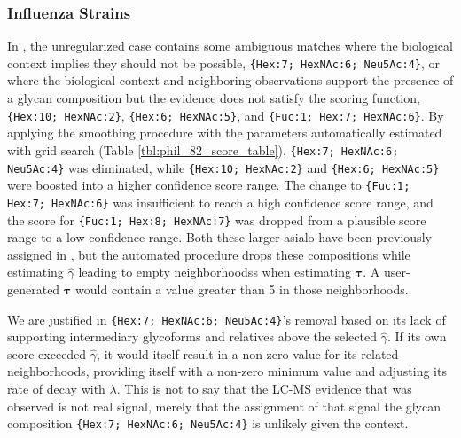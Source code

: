     \subsubsection{Influenza Strains}
        In \phil, the unregularized case contains some ambiguous matches where the biological
    context implies they should not be possible, \texttt{\{Hex:7; HexNAc:6; Neu5Ac:4\}}, or
    where the biological context and neighboring observations support the presence of a glycan
    composition but the evidence does not satisfy the scoring function, \texttt{\{Hex:10; HexNAc:2\}},
    \texttt{\{Hex:6; HexNAc:5\}}, and \texttt{\{Fuc:1; Hex:7; HexNAc:6\}}. By applying the smoothing
    procedure with the parameters automatically estimated with grid search (Table \ref{tbl:phil_82_score_table}),
    \texttt{\{Hex:7; HexNAc:6; Neu5Ac:4\}} was eliminated, while \texttt{\{Hex:10; HexNAc:2\}} and
    \texttt{\{Hex:6; HexNAc:5\}} were boosted into a higher confidence score range. The change
    to \texttt{\{Fuc:1; Hex:7; HexNAc:6\}} was insufficient to reach a high confidence score range,
    and the score for \texttt{\{Fuc:1; Hex:8; HexNAc:7\}} was dropped from a plausible score range
    to a low confidence range. Both these larger asialo-\nglycans have been previously assigned
    in \cite{Khatri2016a},  but the automated procedure drops these compositions while estimating
    ${\hat \gamma}$ leading to empty neighborhoodss when estimating $\mathbf{\tau}$. A user-generated
    $\mathbf{\tau}$ would contain a value greater than 5 in those neighborhoods.

        We are justified in \texttt{\{Hex:7; HexNAc:6; Neu5Ac:4\}}'s removal based on its lack of supporting
    intermediary glycoforms and relatives above the selected $\hat{\gamma}$. If its own score exceeded $\hat{\gamma}$,
    it would itself result in a non-zero value for its related neighborhoods, providing itself with a
    non-zero minimum value and adjusting its rate of decay with $\lambda$. This is not to say that the
    LC-MS evidence that was observed is not real signal, merely that the assignment of that signal the
    glycan composition \texttt{\{Hex:7; HexNAc:6; Neu5Ac:4\}} is unlikely given the context.

